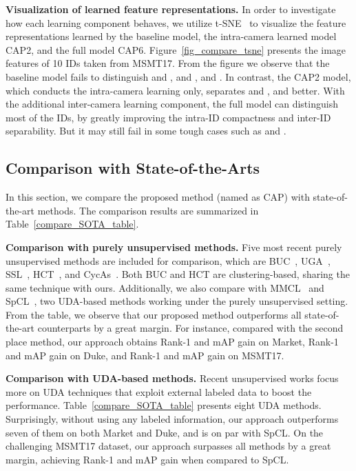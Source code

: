 \documentclass[letterpaper]{article} \usepackage{aaai21}  \usepackage{times}  \usepackage{helvet} \usepackage{courier}  \usepackage[hyphens]{url}  \usepackage{graphicx} \usepackage{subcaption}
\begin{document}
\textbf{Visualization of learned feature representations.} In order to investigate how each learning component behaves, we utilize t-SNE~\cite{vanDerMaaten2008} to visualize the feature representations learned by the baseline model, the intra-camera learned model CAP2, and the full model CAP6. Figure~\ref{fig_compare_tsne} presents the image features of 10 IDs taken from MSMT17. From the figure we observe that the baseline model fails to distinguish  and ,  and ,   and . In contrast, the CAP2 model, which conducts the intra-camera learning only, separates  and ,  and  better. With the additional inter-camera learning component, the full model can distinguish most of the IDs, by greatly improving the intra-ID compactness and inter-ID separability. But it may still fail in some tough cases such as  and .



\subsection{Comparison with State-of-the-Arts}
In this section, we compare the proposed method (named as CAP) with state-of-the-art methods. The comparison results are summarized in Table~\ref{compare_SOTA_table}.

\textbf{Comparison with purely unsupervised methods.} Five most recent purely unsupervised methods are included for comparison, which are BUC~\cite{lin2019aBottom}, UGA~\cite{wu2019graph}, SSL~\cite{lin2020unsupervised}, HCT~\cite{zeng2020hierarchical}, and CycAs~\cite{wang2020cycas}. Both BUC and HCT are clustering-based, sharing the same technique with ours. Additionally, we also compare with MMCL~\cite{wang2020unsupervised} and SpCL~\cite{ge2020self}, two UDA-based methods working under the purely unsupervised setting. From the table, we observe that our proposed method outperforms all state-of-the-art counterparts by a great margin. For instance, compared with the second place method, our approach obtains  Rank-1 and  mAP gain on Market,  Rank-1 and  mAP gain on Duke, and  Rank-1 and  mAP gain on MSMT17.

\textbf{Comparison with UDA-based methods.} Recent unsupervised works focus more on UDA techniques that exploit external labeled data to boost the performance. Table~\ref{compare_SOTA_table} presents eight UDA methods. Surprisingly, without using any labeled information, our approach outperforms seven of them on both Market and Duke, and is on par with SpCL. On the challenging MSMT17 dataset, our approach surpasses all methods by a great margin, achieving  Rank-1 and  mAP gain when compared to SpCL.  
\end{document}
